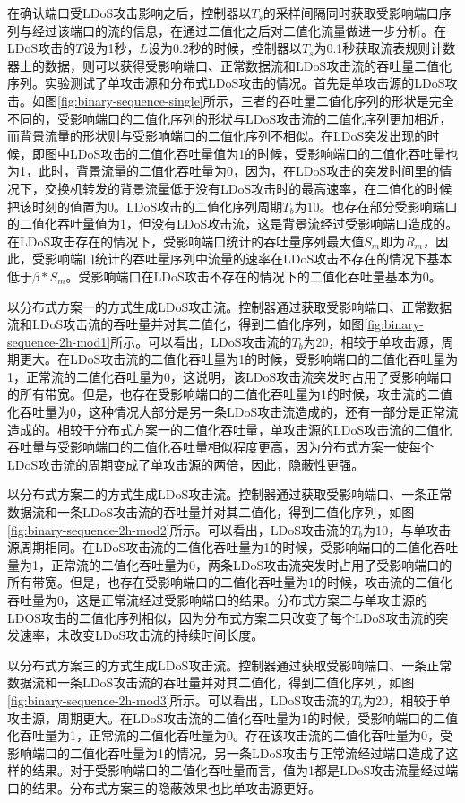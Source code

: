 在确认端口受LDoS攻击影响之后，控制器以$T_s$的采样间隔同时获取受影响端口序列与经过该端口的流的信息，在通过二值化之后对二值化流量做进一步分析。在LDoS攻击的$T$设为1秒，$L$设为0.2秒的时候，控制器以$T_s$为0.1秒获取流表规则计数器上的数据，则可以获得受影响端口、正常数据流和LDoS攻击流的吞吐量二值化序列。实验测试了单攻击源和分布式LDoS攻击的情况。首先是单攻击源的LDoS攻击。如图\ref{fig:binary-sequence-single}所示，三者的吞吐量二值化序列的形状是完全不同的，受影响端口的二值化序列的形状与LDoS攻击流的二值化序列更加相近，而背景流量的形状则与受影响端口的二值化序列不相似。在LDoS突发出现的时候，即图中LDoS攻击的二值化吞吐量值为1的时候，受影响端口的二值化吞吐量也为1，此时，背景流量的二值化吞吐量为0，因为，在LDoS攻击的突发时间里的情况下，交换机转发的背景流量低于没有LDoS攻击时的最高速率，在二值化的时候把该时刻的值置为0。LDoS攻击的二值化序列周期$T_b$为10。也存在部分受影响端口的二值化吞吐量值为1，但没有LDoS攻击流，这是背景流经过受影响端口造成的。在LDoS攻击存在的情况下，受影响端口统计的吞吐量序列最大值$S_m$即为$R_m$，因此，受影响端口统计的吞吐量序列中流量的速率在LDoS攻击不存在的情况下基本低于$\beta * S_m$。受影响端口在LDoS攻击不存在的情况下的二值化吞吐量基本为0。

以分布式方案一的方式生成LDoS攻击流。控制器通过获取受影响端口、正常数据流和LDoS攻击流的吞吐量并对其二值化，得到二值化序列，如图\ref{fig:binary-sequence-2h-mod1}所示。可以看出，LDoS攻击流的$T_b$为20，相较于单攻击源，周期更大。在LDoS攻击流的二值化吞吐量为1的时候，受影响端口的二值化吞吐量为1，正常流的二值化吞吐量为0，这说明，该LDoS攻击流突发时占用了受影响端口的所有带宽。但是，也存在受影响端口的二值化吞吐量为1的时候，攻击流的二值化吞吐量为0，这种情况大部分是另一条LDoS攻击流造成的，还有一部分是正常流造成的。相较于分布式方案一的二值化吞吐量，单攻击源的LDoS攻击流的二值化吞吐量与受影响端口的二值化吞吐量相似程度更高，因为分布式方案一使每个LDoS攻击流的周期变成了单攻击源的两倍，因此，隐蔽性更强。


以分布式方案二的方式生成LDoS攻击流。控制器通过获取受影响端口、一条正常数据流和一条LDoS攻击流的吞吐量并对其二值化，得到二值化序列，如图\ref{fig:binary-sequence-2h-mod2}所示。可以看出，LDoS攻击流的$T_b$为10，与单攻击源周期相同。在LDoS攻击流的二值化吞吐量为1的时候，受影响端口的二值化吞吐量为1，正常流的二值化吞吐量为0，两条LDoS攻击流突发时占用了受影响端口的所有带宽。但是，也存在受影响端口的二值化吞吐量为1的时候，攻击流的二值化吞吐量为0，这是正常流经过受影响端口的结果。分布式方案二与单攻击源的LDOS攻击的二值化序列相似，因为分布式方案二只改变了每个LDoS攻击流的突发速率，未改变LDoS攻击流的持续时间长度。

以分布式方案三的方式生成LDoS攻击流。控制器通过获取受影响端口、一条正常数据流和一条LDoS攻击流的吞吐量并对其二值化，得到二值化序列，如图\ref{fig:binary-sequence-2h-mod3}所示。可以看出，LDoS攻击流的$T_b$为20，相较于单攻击源，周期更大。在LDoS攻击流的二值化吞吐量为1的时候，受影响端口的二值化吞吐量为1，正常流的二值化吞吐量为0。存在该攻击流的二值化吞吐量为0，受影响端口的二值化吞吐量为1的情况，另一条LDoS攻击与正常流经过端口造成了这样的结果。对于受影响端口的二值化吞吐量而言，值为1都是LDoS攻击流量经过端口的结果。分布式方案三的隐蔽效果也比单攻击源更好。

